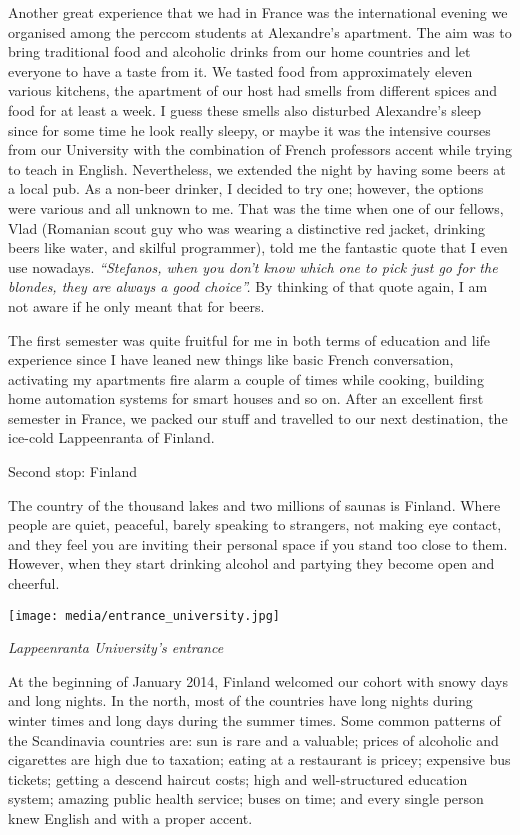 \documentclass[10pt,a4paper]{article} %
\newcommand{\NewsItem}[1]{ %
\usefont{T1}{fvs}{n}{n} %
\vspace{24pt}\large #1\vspace{3pt} %
\par \normalsize \normalfont}
\begin{document}
\begin{multicols}{3}
Another great experience that we had in France was the international evening 
we organised among the {\sc perccom} students at Alexandre's apartment. 
The aim was to bring traditional food and alcoholic drinks from our home countries 
and let everyone to have a taste from it. 
We tasted food from approximately eleven various kitchens, the apartment of our 
host had smells from different spices and food for at least a week. 
I guess these smells also disturbed Alexandre's sleep since for some time he look 
really sleepy, or maybe it was the intensive courses from our University with the 
combination of French professors accent while trying to teach in English.  
Nevertheless, we extended the night by having some beers at a local pub. 
As a non-beer drinker, I decided to try one; however, the options were various 
and all unknown to me. 
That was the time when one of our fellows, Vlad (Romanian scout guy who was wearing a 
distinctive red jacket, drinking beers like water, and skilful programmer), 
told me the fantastic quote that I even use nowadays. 
\textit{``Stefanos, when you don't know which one to pick just go for the blondes, 
	they are always a good choice''.} 
By thinking of that quote again, I am not aware if he only meant that for beers.

The first semester was quite fruitful for me in both terms of education and 
life experience since I have leaned new things like basic French conversation, 
activating my apartments fire alarm a couple of times while cooking, building home 
automation systems for smart houses and so on. 
After an excellent first semester in France, we packed our stuff and travelled 
to our next destination, the ice-cold Lappeenranta of Finland.

\NewsItem{Second stop: Finland}
The country of the thousand lakes and two millions of saunas is Finland. 
Where people are quiet, peaceful, barely speaking to strangers, not making eye 
contact, and they feel you are inviting their personal space if you stand too 
close to them. 
However, when they start drinking alcohol and partying they become open and cheerful. 
   
\begin{center}
	\texttt{[image: media/entrance\_university.jpg]}
	\par\textit{Lappeenranta University's entrance}
\end{center}

At the beginning of January 2014, Finland welcomed our cohort with snowy days 
and long nights. 
In the north, most of the countries have long nights during winter times and long 
days during the summer times. 
Some common patterns of the Scandinavia countries are: sun is rare and a valuable; 
prices of alcoholic and cigarettes are high due to taxation; eating at a restaurant 
is pricey; expensive bus tickets; getting a descend haircut costs; 
high and well-structured education system; amazing public health service; buses on time; 
and every single person knew English and with a proper accent.


\end{multicols}
\end{document}
